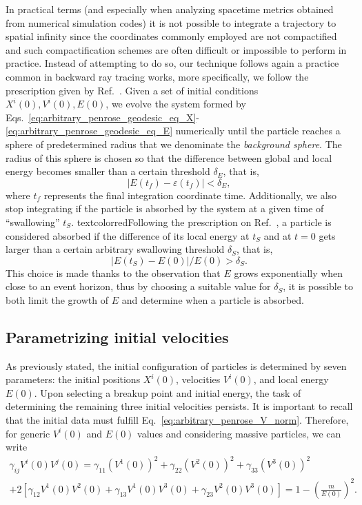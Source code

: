 In practical terms (and especially when analyzing spacetime metrics obtained from numerical simulation codes) it is not possible to integrate a trajectory to spatial infinity since the coordinates commonly employed are not compactified and such compactification schemes are often difficult or impossible to perform in practice.
Instead of attempting to do so, our technique follows again a practice common in backward ray tracing works, more specifically, we follow the prescription given by Ref.~\cite{Bohn:2014xxa}. Given a set of initial conditions $X^i(0), V^i(0), E(0)$, we evolve the system formed by Eqs.~\eqref{eq:arbitrary_penrose_geodesic_eq_X}-\eqref{eq:arbitrary_penrose_geodesic_eq_E} numerically until the particle reaches a sphere of predetermined radius that we denominate the \emph{background sphere}. The radius of this sphere is chosen so that the difference between global and local energy becomes smaller than a certain threshold $\delta_E$, that is, 
%
\begin{equation}
  |E(t_f)- \varepsilon(t_f)| < \delta_E,
  \label{eq:arbitrary_penrose_background_sphere_cplision_condition}
\end{equation}
%
where $t_f$ represents the final integration coordinate time. Additionally, we also stop integrating if the particle is absorbed by the system at a given time of ``swallowing'' $t_S$. textcolor{red}{Following the prescription on Ref.~\cite{Bohn:2014xxa}}, a particle is considered absorbed if the difference of its local energy at $t_S$ and at $t=0$ gets larger than a certain arbitrary swallowing threshold $\delta_S$, that is, 
%
\begin{equation}
  |E(t_S) - E(0)|/E(0) > \delta_S.
  \label{eq:arbitrary_penrose_swallowing_condition}
\end{equation}
%
This choice is made thanks to the observation that $E$ grows exponentially when close to an event horizon, thus by choosing a suitable value for $\delta_S$, it is possible to both limit the growth of $E$ and determine when a particle is absorbed.

\subsection{Parametrizing initial velocities}

As previously stated, the initial configuration of particles is determined by seven parameters: the initial positions $X^i(0)$, velocities $V^i(0)$, and local energy $E(0)$. Upon selecting a breakup point and initial energy, the task of determining the remaining three initial velocities persists. It is important to recall that the initial data must fulfill Eq.~\eqref{eq:arbitrary_penrose_V_norm}. Therefore, for generic $V^i(0)$ and $E(0)$ values and considering massive particles, we can write
%
\begin{multline}
  \gamma_{ij} V^{i}(0)V^{j}(0) = \gamma_{11}\left(V^1(0)\right)^2 + \gamma_{22}\left(V^2(0)\right)^2 + \gamma_{33}\left(V^3(0)\right)^2 \\
  + 2\left[ \gamma_{12}V^1(0)V^2(0) + \gamma_{13}V^1(0)V^3(0) + \gamma_{23}V^2(0)V^3(0) \right] = 1-\left(\frac{m}{E(0)}\right)^2.
  \label{eq:arbitrary_penrose_initial_v_explicit_expansion}
\end{multline}

